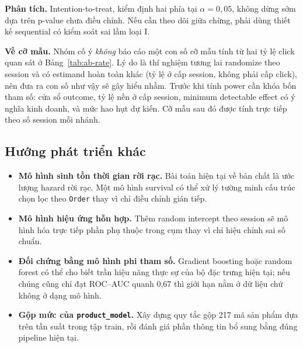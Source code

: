 \textbf{Phân tích.} Intention-to-treat, kiểm định hai phía tại
$\alpha = 0{,}05$, không dừng sớm dựa trên p-value chưa điều chỉnh. Nếu cần theo
dõi giữa chừng, phải dùng thiết kế sequential có kiểm soát sai lầm loại I.

\textbf{Về cỡ mẫu.} Nhóm cố ý \emph{không} báo cáo một con số cỡ mẫu tính từ hai
tỷ lệ click quan sát ở Bảng~\ref{tab:ab-rate}. Lý do là thí nghiệm tương lai
randomize theo session và có estimand hoàn toàn khác (tỷ lệ ở cấp session, không
phải cấp click), nên đưa ra con số như vậy sẽ gây hiểu nhầm. Trước khi tính
power cần khóa bốn tham số: cửa sổ outcome, tỷ lệ nền ở cấp session, minimum
detectable effect có ý nghĩa kinh doanh, và mức hao hụt dự kiến. Cỡ mẫu sau đó
được tính trực tiếp theo số session mỗi nhánh.

\subsection{Hướng phát triển khác}

\begin{itemize}
  \item \textbf{Mô hình sinh tồn thời gian rời rạc.} Bài toán hiện tại về bản
  chất là ước lượng hazard rời rạc. Một mô hình survival có thể xử lý tường minh
  cấu trúc chọn lọc theo \texttt{Order} thay vì chỉ điều chỉnh gián tiếp.

  \item \textbf{Mô hình hiệu ứng hỗn hợp.} Thêm random intercept theo session sẽ
  mô hình hóa trực tiếp phần phụ thuộc trong cụm thay vì chỉ hiệu chỉnh sai số
  chuẩn.

  \item \textbf{Đối chứng bằng mô hình phi tham số.} Gradient boosting hoặc
  random forest có thể cho biết trần hiệu năng thực sự của bộ đặc trưng hiện tại;
  nếu chúng cũng chỉ đạt ROC--AUC quanh 0,67 thì giới hạn nằm ở dữ liệu chứ không
  ở dạng mô hình.

  \item \textbf{Gộp mức của \texttt{product\_model}.} Xây dựng quy tắc gộp 217 mã
  sản phẩm dựa trên tần suất trong tập train, rồi đánh giá phần thông tin bổ sung
  bằng đúng pipeline hiện tại.
\end{itemize}
